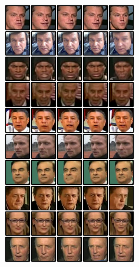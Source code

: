 \documentclass{article} %
\begin{document}
\begin{figure}[!hb]
\centering
\begin{minipage}{0.3\textwidth}
\includegraphics[width=1\linewidth]{input_faces_rgb.png}
\end{minipage}
\begin{minipage}{0.3\textwidth}

\end{minipage}
\end{figure}
\end{document}
